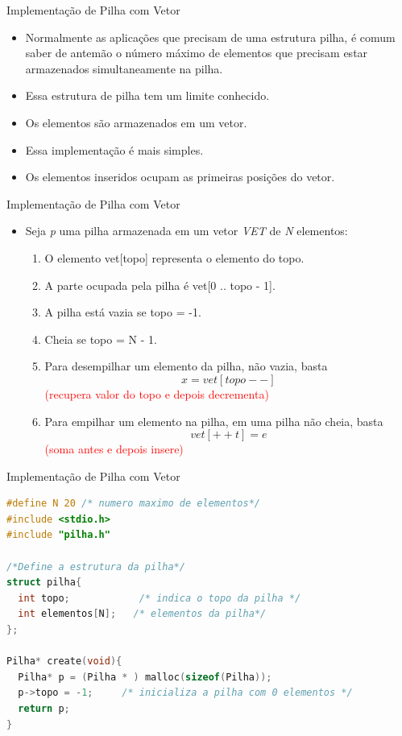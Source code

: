 \begin{frame}{Implementação de Pilha com Vetor}  
	\begin{itemize}
		\item Normalmente as aplicações que precisam de uma 
		estrutura pilha, é comum saber de antemão o número 
		máximo de elementos que precisam estar armazenados 
		simultaneamente na pilha.
		\item Essa estrutura de pilha tem um limite conhecido.
		\item Os elementos são armazenados em um vetor.
		\item Essa implementação é mais simples.
		\item Os elementos inseridos ocupam as primeiras posições do vetor. 
	\end{itemize}
\end{frame}

\begin{frame}{Implementação de Pilha com Vetor}  
	\begin{itemize}
		\item Seja \textit{p} uma pilha armazenada em um vetor \textit{VET} de \textit{N} elementos:		
			\begin{enumerate}
				\item O elemento vet[topo] representa o elemento do topo.
				\item A parte ocupada pela pilha é vet[0 .. topo - 1].
				\item A pilha está vazia se topo = -1.
				\item Cheia se topo = N - 1.
				\item Para desempilhar um elemento da pilha, não vazia,
				 basta $$x = vet[topo--]$$ \textcolor{red}{(recupera valor do topo e depois decrementa)} 
				\item Para empilhar um elemento na pilha, em uma pilha não cheia, 
				basta $$vet[++t] = e$$   \textcolor{red}{(soma antes e depois insere)}
			\end{enumerate}
	\end{itemize}
\end{frame}

\begin{frame}[fragile]{Implementação de Pilha com Vetor}
\begin{lstlisting}[language=C]
#define N 20 /* numero maximo de elementos*/
#include <stdio.h>
#include "pilha.h"

/*Define a estrutura da pilha*/
struct pilha{
  int topo;            /* indica o topo da pilha */
  int elementos[N];   /* elementos da pilha*/
};

Pilha* create(void){
  Pilha* p = (Pilha * ) malloc(sizeof(Pilha));
  p->topo = -1;     /* inicializa a pilha com 0 elementos */
  return p;
}	
	\end{lstlisting}  
\end{frame}

